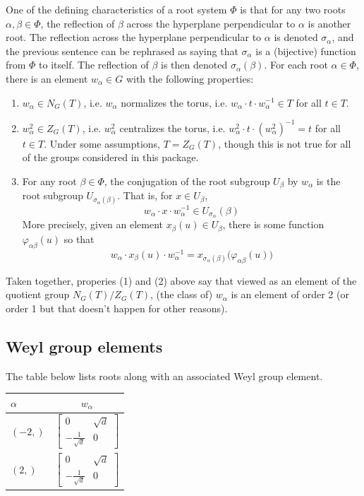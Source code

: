 \documentclass[11pt]{article}
\newcommand{\noi}{\noindent}
\newcommand{\inv}{^{-1}}
\newcommand{\sig}{\sigma}
\theoremstyle{definition}
\begin{document}
One of the defining characteristics of a root system $\Phi$ is that for any two roots $\alpha, \beta \in \Phi$, the reflection of $\beta$ across the hyperplane perpendicular to $\alpha$ is another root. The reflection across the hyperplane perpendicular to $\alpha$ is denoted $\sig_\alpha$, and the previous sentence can be rephrased as saying that $\sig_\alpha$ is a (bijective) function from $\Phi$ to itself. The reflection of $\beta$ is then denoted $\sig_\alpha(\beta)$. For each root $\alpha \in \Phi$, there is an element $w_\alpha \in G$ with the following properties:
\begin{enumerate}
	\item $w_\alpha \in N_G(T)$, i.e. $w_\alpha$ normalizes the torus, i.e. $w_\alpha \cdot t \cdot w_\alpha \inv \in T$ for all $t \in T$.
	\item $w_\alpha^2 \in Z_G(T)$, i.e. $w_\alpha^2$ centralizes the torus, i.e. $w_\alpha^2 \cdot t \cdot (w_\alpha^2) \inv = t$ for all $t \in T$. Under some assumptions, $T = Z_G(T)$, though this is not true for all of the groups considered in this package.
	\item For any root $\beta \in \Phi$, the conjugation of the root subgroup $U_\beta$ by $w_\alpha$ is the root subgroup $U_{\sig_\alpha(\beta)}$. That is, for $x \in U_\beta$,
	\[
		w_\alpha \cdot x \cdot w_\alpha \inv \in U_{\sig_{\alpha}}(\beta)
	\]
	More precisely, given an element $x_\beta(u) \in U_\beta$, there is some function $\varphi_{\alpha \beta}(u)$ so that
	\[
		w_\alpha \cdot x_\beta(u) \cdot w_\alpha \inv = x_{\sig_{\alpha}(\beta)} \Big( \varphi_{\alpha \beta}(u) \Big)
	\]
\end{enumerate}
Taken together, properies (1) and (2) above say that viewed as an element of the quotient group $N_G(T)/Z_G(T)$, (the class of) $w_\alpha$ is an element of order 2 (or order 1 but that doesn't happen for other reasons).

\subsection{Weyl group elements}

\noi The table below lists roots along with an associated Weyl group element.

\bigskip

\noi \noindent \begin{longtable}{|l|c|}
    \hline
    $\alpha$ & $w_\alpha$ \\
    \hline
    \endhead
    $\left( -2,\right)$ & ${\left[\begin{matrix}0 & \sqrt{d}\\- \frac{1}{\sqrt{d}} & 0\end{matrix}\right]}$ \\
    \hline
    $\left( 2,\right)$ & ${\left[\begin{matrix}0 & \sqrt{d}\\- \frac{1}{\sqrt{d}} & 0\end{matrix}\right]}$ \\
    \hline
\end{longtable}
\end{document}
